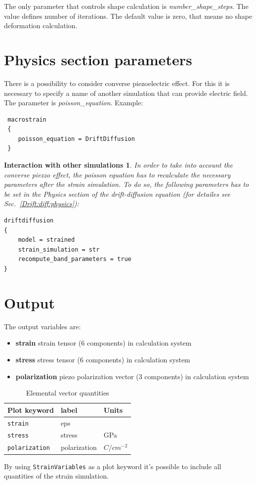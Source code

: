 The only parameter that controls shape calculation is
\textit{number\_shape\_steps}. The value defines number of iterations. The default value is zero, that means no shape deformation calculation.

\section{Physics section parameters}
There is a possibility to consider converse piezoelectric effect. For this it is necessary to specify a name of another simulation that can provide electric field.
The parameter is {\textit{poisson\_equation}}. Example:
\begin{verbatim}
 macrostrain
 {
    poisson_equation = DriftDiffusion
 }
\end{verbatim}
\newtheorem*{conv:piezo}{Interaction with other simulations}
\begin{conv:piezo}
 In order to take into account the converse piezzo effect, the poisson equation has to recalculate the necessary parameters after the strain simulation. To do so, the following parameters has to be set in the Physics section of the drift-diffusion equation (for detailes see Sec.~\ref{Drift:diff:physics}):
\begin{verbatim}
driftdiffusion
{
    model = strained
    strain_simulation = str
    recompute_band_parameters = true 
}
\end{verbatim}
\end{conv:piezo}

\section{Output} 
The output variables are:
\begin{itemize}
\item 
\textbf{strain}  strain tensor (6 components) in calculation system  
\item 
\textbf{stress}  stress tensor (6 components) in calculation system  
\item
\textbf{polarization}  piezo polarization vector (3 components) in calculation system    
\end{itemize}



\begin{table}[htb]
\center
\begin{tabular}{l|l|l}
\textbf{Plot keyword}  & \textbf{label}    & \textbf{Units} \\
\hline 
\texttt{strain}  & eps                     &  \\
\texttt{stress}      & stress                     & GPa \\
\texttt{polarization}      & polarization               & $C/cm^{-2}$ \\
\end{tabular}
\caption{Elemental vector quantities}
\label{table:elemental quantities}
\end{table}


By using \texttt{StrainVariables} as a plot keyword it's possible to include all quantities of the strain simulation.


